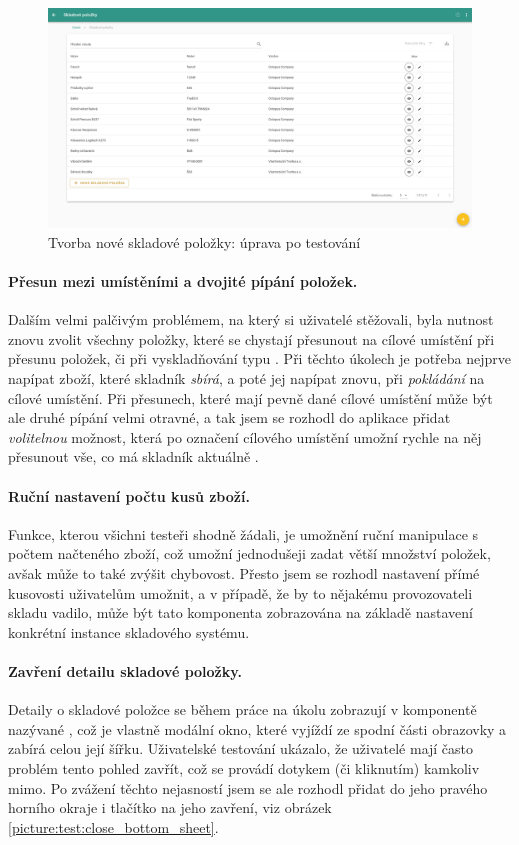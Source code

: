\begin{figure}[h]
\includegraphics[width=\textwidth]{../png/app_testing/plus_after.png}
\caption{Tvorba nové skladové položky: úprava po testování} \label{picture:test:add_after}
\end{figure}


\paragraph{Přesun mezi umístěními a dvojité pípání položek.} Dalším velmi palčivým problémem, na který si uživatelé stěžovali, byla nutnost znovu zvolit všechny položky, které se chystají přesunout na cílové umístění při přesunu položek, či při vyskladňování typu . Při těchto úkolech je potřeba nejprve napípat zboží, které skladník \emph{sbírá}, a poté jej napípat znovu, při \emph{pokládání} na cílové umístění. Při přesunech, které mají pevně dané cílové umístění může být ale druhé pípání velmi otravné, a tak jsem se rozhodl do aplikace přidat \emph{volitelnou} možnost, která po označení cílového umístění umožní rychle na něj přesunout vše, co má skladník aktuálně . 

\paragraph{Ruční nastavení počtu kusů zboží.} Funkce, kterou všichni testeři shodně žádali, je umožnění ruční manipulace s počtem načteného zboží, což umožní jednodušeji zadat větší množství položek, avšak může to také zvýšit chybovost. Přesto jsem se rozhodl nastavení přímé kusovosti uživatelům umožnit, a v případě, že by to nějakému provozovateli skladu vadilo, může být tato komponenta zobrazována na základě nastavení konkrétní instance skladového systému.

\paragraph{Zavření detailu skladové položky.} Detaily o skladové položce se během práce na úkolu zobrazují v komponentě nazývané , což je vlastně modální okno, které vyjíždí ze spodní části obrazovky a zabírá celou její šířku. Uživatelské testování ukázalo, že uživatelé mají často problém tento pohled zavřít, což se provádí dotykem (či kliknutím) kamkoliv mimo. Po zvážení těchto nejasností jsem se ale rozhodl přidat do jeho pravého horního okraje i tlačítko na jeho zavření, viz obrázek \ref{picture:test:close_bottom_sheet}.

